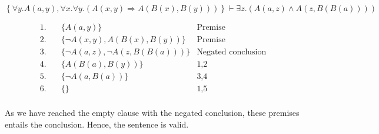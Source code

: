 \documentclass[12pt]{article}
\begin{document}
\[ \left\{\forall y.A(a, y), \forall x.\forall y.\left(A(x, y) \Rightarrow A(B(x),B(y))\right)\right\} \vdash \exists z.\left(A(a, z) \land A(z,B(B(a)))\right) \]

\begin{align*}
    1. \hspace{1em} & \{ A(a, y) \}                                                                 & \text{Premise} \\
    2. \hspace{1em} & \{ \neg A(x,y), A(B(x), B(y)) \}                                              & \text{Premise} \\
    3. \hspace{1em} & \{ \neg A(a,z), \neg A(z, B(B(a))) \}                                         & \text{Negated conclusion} \\
    4. \hspace{1em} & \{ A(B(a), B(y)) \}                                                           & \text{1,2} \\
    5. \hspace{1em} & \{ \neg A(a, B(a)) \}                                                         & \text{3,4} \\
    6. \hspace{1em} & \{ \}                                                                         & \text{1,5} \\
\end{align*}

As we have reached the empty clause with the negated conclusion, these premises entails the conclusion. Hence, the sentence is valid. 
\end{document}
